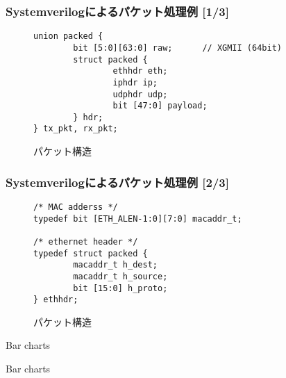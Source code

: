 \documentclass[10pt, compress]{beamer}
\begin{document}

\begin{frame}[fragile,t]
  \frametitle{Systemverilogによるパケット処理例 [1/3]}

\begin{figure}

\begin{verbatim}
union packed {
        bit [5:0][63:0] raw;      // XGMII (64bit)
        struct packed {
                ethhdr eth;
                iphdr ip;
                udphdr udp;
                bit [47:0] payload;
        } hdr;
} tx_pkt, rx_pkt;
\end{verbatim}
\vspace{-1em}
\caption{パケット構造}
\end{figure}

\end{frame}



\begin{frame}[fragile,t]
  \frametitle{Systemverilogによるパケット処理例 [2/3]}

\begin{figure}

\begin{verbatim}
/* MAC adderss */
typedef bit [ETH_ALEN-1:0][7:0] macaddr_t;

/* ethernet header */
typedef struct packed {
        macaddr_t h_dest;
        macaddr_t h_source;
        bit [15:0] h_proto;
} ethhdr;
\end{verbatim}
\vspace{-1em}
\caption{パケット構造}
\end{figure}

\end{frame}


\begin{frame}{Bar charts}
  \begin{figure}
    
  \end{figure}
\end{frame}



\begin{frame}{Bar charts}
  \begin{figure}
	\resizebox{\textheight}{!}{}
  \end{figure}
\end{frame}
\end{document}
